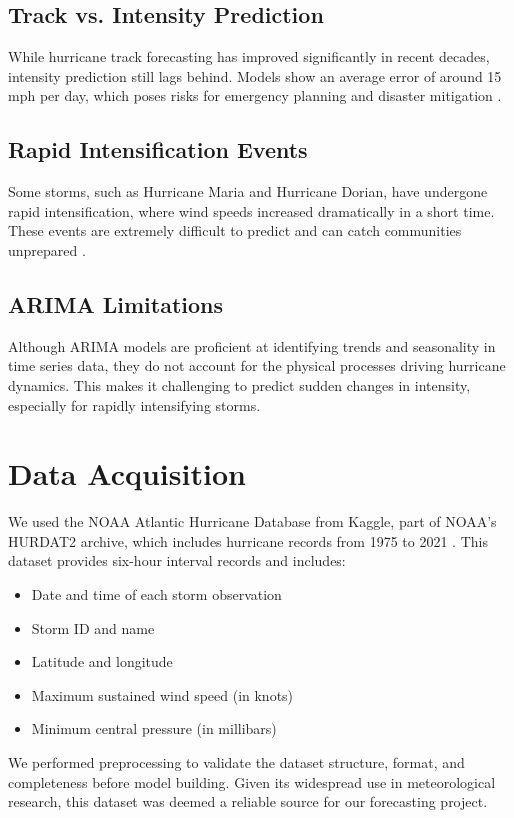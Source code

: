 \subsection{Track vs. Intensity Prediction}
While hurricane track forecasting has improved significantly in recent decades, intensity prediction still lags behind. Models show an average error of around 15 mph per day, which poses risks for emergency planning and disaster mitigation \cite{de2019evaluation}.

\subsection{Rapid Intensification Events}
Some storms, such as Hurricane Maria and Hurricane Dorian, have undergone rapid intensification, where wind speeds increased dramatically in a short time. These events are extremely difficult to predict and can catch communities unprepared \cite{kaplan2003large}.

\subsection{ARIMA Limitations}
Although ARIMA models are proficient at identifying trends and seasonality in time series data, they do not account for the physical processes driving hurricane dynamics. This makes it challenging to predict sudden changes in intensity, especially for rapidly intensifying storms.

\section{Data Acquisition}
We used the NOAA Atlantic Hurricane Database from Kaggle, part of NOAA’s HURDAT2 archive, which includes hurricane records from 1975 to 2021 \cite{noaa2021hurdat2, kaggle2021hurricane}. This dataset provides six-hour interval records and includes:

\begin{itemize}
	\item Date and time of each storm observation
	\item Storm ID and name
	\item Latitude and longitude
	\item Maximum sustained wind speed (in knots)
	\item Minimum central pressure (in millibars)
\end{itemize}

We performed preprocessing to validate the dataset structure, format, and completeness before model building. Given its widespread use in meteorological research, this dataset was deemed a reliable source for our forecasting project.

